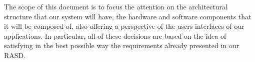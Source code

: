 The scope of this document is to focus the attention on the architectural structure that our system will have, the hardware and software components that it will be composed of, also offering a perspective of the users interfaces of our applications. 
\newline
In particular, all of these decisions are based on the idea of satisfying in the best possible way the requirements already presented in our RASD. 